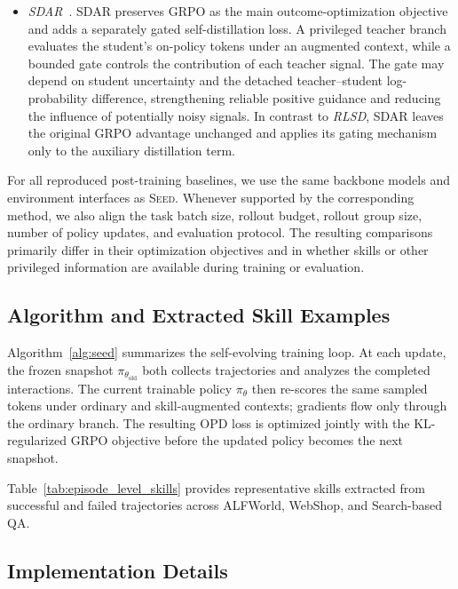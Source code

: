 \begin{itemize}
    \item \textit{SDAR}~\citep{lu2026sdar}.
    SDAR preserves GRPO as the main outcome-optimization objective and adds a separately gated self-distillation loss.
    A privileged teacher branch evaluates the student's on-policy tokens under an augmented context, while a bounded gate controls the contribution of each teacher signal.
    The gate may depend on student uncertainty and the detached teacher--student log-probability difference, strengthening reliable positive guidance and reducing the influence of potentially noisy signals.
    In contrast to \textit{RLSD}, SDAR leaves the original GRPO advantage unchanged and applies its gating mechanism only to the auxiliary distillation term.
\end{itemize}

For all reproduced post-training baselines, we use the same backbone models and environment interfaces as \textsc{Seed}.
Whenever supported by the corresponding method, we also align the task batch size, rollout budget, rollout group size, number of policy updates, and evaluation protocol.
The resulting comparisons primarily differ in their optimization objectives and in whether skills or other privileged information are available during training or evaluation.

\subsection{Algorithm and Extracted Skill Examples}\label{app:algorithm_skills}
Algorithm~\ref{alg:seed} summarizes the self-evolving training loop. At each update, the frozen snapshot $\pi_{\theta_{\mathrm{old}}}$ both collects trajectories and analyzes the completed interactions. The current trainable policy $\pi_\theta$ then re-scores the same sampled tokens under ordinary and skill-augmented contexts; gradients flow only through the ordinary branch. The resulting OPD loss is optimized jointly with the KL-regularized GRPO objective before the updated policy becomes the next snapshot.

Table~\ref{tab:episode_level_skills} provides representative skills extracted from successful and failed trajectories across ALFWorld, WebShop, and Search-based QA.




\subsection{Implementation Details}
\label{app:implementation_details}

